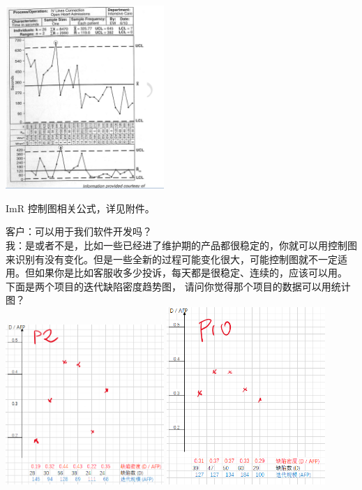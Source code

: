 
\includegraphics[width=6cm]{控制图08.png}

ImR 控制图相关公式，详见附件。

客户：可以用于我们软件开发吗？\\
我：是或者不是，比如一些已经进了维护期的产品都很稳定的，你就可以用控制图来识别有没有变化。但是一些全新的过程可能变化很大，可能控制图就不一定适用。但如果你是比如客服收多少投诉，每天都是很稳定、连续的，应该可以用。
下面是两个项目的迭代缺陷密度趋势图，
请问你觉得那个项目的数据可以用统计图？\\

\includegraphics[width=6cm]{P2CcScreenshot_2021-09-25_111304.png}
\includegraphics[width=6cm]{P10CcScreenshot_2021-09-25_104057.png}

